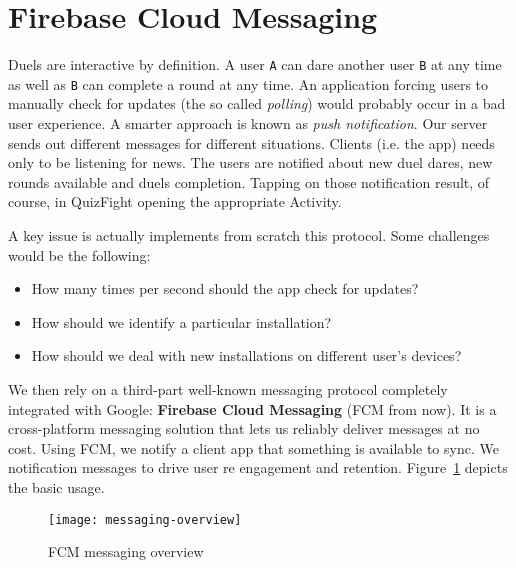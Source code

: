 \section{Firebase Cloud Messaging}
Duels are interactive by definition. A user \texttt{A} can dare another user \texttt{B} at any time as well as \texttt{B} can complete a round at any time. An application forcing users to manually check for updates (the so called \textit{polling}) would probably occur in a bad user experience. A smarter approach is known as \textit{push notification}. Our server sends out different messages for different situations. Clients (i.e. the app) needs only to be listening for news. The users are notified about new duel dares, new rounds available and duels completion. Tapping on those notification result, of course, in QuizFight opening the appropriate Activity. 

A key issue is actually implements from scratch this protocol. Some challenges would be the following:
\begin{itemize}
	\item How many times per second should the app check for updates?
	\item How should we identify a particular installation?
	\item How should we deal with new installations on different user's devices?
\end{itemize}

We then rely on a third-part well-known messaging protocol completely integrated with Google: \textbf{Firebase Cloud Messaging} (FCM from now). It is a cross-platform messaging solution that lets us reliably deliver messages at no cost. Using FCM, we notify a client app that something is available to sync. We notification messages to drive user re engagement and retention. Figure~\ref{fig:messaging-overview} depicts the basic usage.
\begin{figure}[h]
	\centering
	\texttt{[image: messaging-overview]}
	\caption[FCM messaging overview]{FCM messaging overview}
	\label{fig:messaging-overview}
\end{figure}

